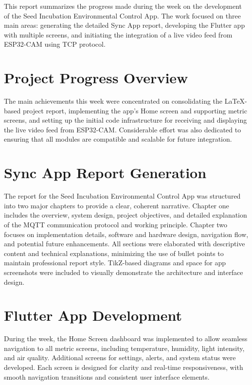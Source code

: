 \documentclass[../weekly]{subfiles}
\begin{document}

This report summarizes the progress made during the week on the development of the Seed Incubation Environmental Control App. The work focused on three main areas: generating the detailed Sync App report, developing the Flutter app with multiple screens, and initiating the integration of a live video feed from ESP32-CAM using TCP protocol.

\section{Project Progress Overview}

The main achievements this week were concentrated on consolidating the LaTeX-based project report, implementing the app’s Home screen and supporting metric screens, and setting up the initial code infrastructure for receiving and displaying the live video feed from ESP32-CAM. Considerable effort was also dedicated to ensuring that all modules are compatible and scalable for future integration.

\section{Sync App Report Generation}

The report for the Seed Incubation Environmental Control App was structured into two major chapters to provide a clear, coherent narrative. Chapter one includes the overview, system design, project objectives, and detailed explanation of the MQTT communication protocol and working principle. Chapter two focuses on implementation details, software and hardware design, navigation flow, and potential future enhancements. All sections were elaborated with descriptive content and technical explanations, minimizing the use of bullet points to maintain professional report style. TikZ-based diagrams and space for app screenshots were included to visually demonstrate the architecture and interface design.

\section{Flutter App Development}

During the week, the Home Screen dashboard was implemented to allow seamless navigation to all metric screens, including temperature, humidity, light intensity, and air quality. Additional screens for settings, alerts, and system status were developed. Each screen is designed for clarity and real-time responsiveness, with smooth navigation transitions and consistent user interface elements.
\end{document}
